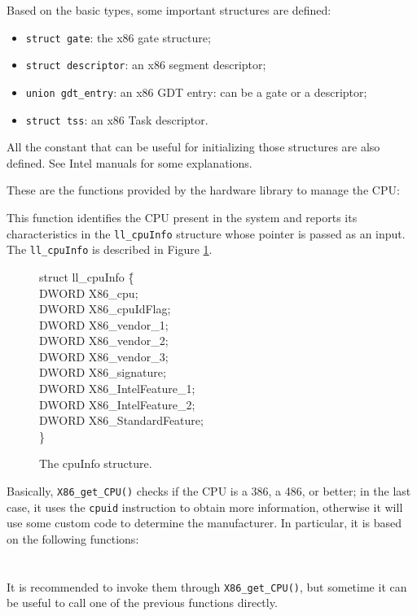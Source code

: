 \documentclass[a4paper]{report}
\begin{document}
Based on the basic types, some important structures are defined:
\begin{itemize}
	\item {\tt struct gate}: the x86 gate structure;
	\item {\tt struct descriptor}: an x86 segment descriptor;
	\item {\tt union gdt\_entry}: an x86 GDT entry: can be a
		gate or a descriptor;
	\item {\tt struct tss}: an x86 Task descriptor.
\end{itemize}
All the constant that can be useful for initializing those structures are
also defined. See Intel manuals for some explanations.

These are the functions provided by the hardware library to manage
the CPU:


This function identifies the CPU present in the system and reports
its characteristics in the {\tt ll\_cpuInfo} structure whose pointer is
passed as an input. The {\tt ll\_cpuInfo} is described in Figure
\ref{fig:cpuinfo}.
\begin{figure}
\begin{tt}
\begin{tabbing}
struct ll\_cpuInfo \= \{					\\
\>	DWORD X86\_cpu;						\\
\>	DWORD X86\_cpuIdFlag;					\\
\>	DWORD X86\_vendor\_1;					\\
\>	DWORD X86\_vendor\_2;					\\
\>	DWORD X86\_vendor\_3;					\\
\>	DWORD X86\_signature;					\\
\>	DWORD X86\_IntelFeature\_1;				\\
\>	DWORD X86\_IntelFeature\_2;				\\
\>	DWORD X86\_StandardFeature;				\\
\}
\end{tabbing}
\end{tt}
\label{fig:cpuinfo}
\caption{The cpuInfo structure.}
\end{figure}

Basically, {\tt X86\_get\_CPU()} checks if the CPU is a 386, a 486, or
better; in the last case, it uses the {\tt cpuid} instruction to obtain
more information, otherwise it will use some custom code to determine the
manufacturer. In particular, it is based on the following functions:
			\\
			\\
			\\
It is recommended to invoke them through {\tt X86\_get\_CPU()}, but
sometime it can be useful to call one of the previous functions directly.
\end{document}
